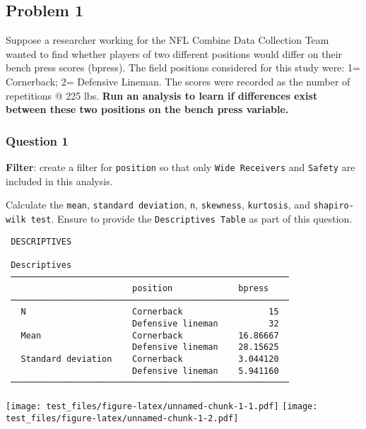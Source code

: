 \documentclass[
]{article}
\begin{document}
\hypertarget{problem-1}{%
\subsection{Problem 1}\label{problem-1}}

Suppose a researcher working for the NFL Combine Data Collection Team
wanted to find whether players of two different positions would differ
on their bench press scores (bpress). The field positions considered for
this study were: 1= Cornerback; 2= Defensive Lineman. The scores were
recorded as the number of repetitions @ 225 lbs. \textbf{Run an analysis
to learn if differences exist between these two positions on the bench
press variable.}

\hypertarget{question-1}{%
\subsubsection{Question 1}\label{question-1}}

\textbf{Filter}: create a filter for \texttt{position} so that only
\texttt{Wide\ Receivers} and \texttt{Safety} are included in this
analysis.

Calculate the \texttt{mean}, \texttt{standard\ deviation}, \texttt{n},
\texttt{skewness}, \texttt{kurtosis}, and \texttt{shapiro-wilk\ test}.
Ensure to provide the \texttt{Descriptives\ Table} as part of this
question.

\begin{verbatim}
 DESCRIPTIVES

 Descriptives                                            
 ─────────────────────────────────────────────────────── 
                         position             bpress     
 ─────────────────────────────────────────────────────── 
   N                     Cornerback                 15   
                         Defensive lineman          32   
   Mean                  Cornerback           16.86667   
                         Defensive lineman    28.15625   
   Standard deviation    Cornerback           3.044120   
                         Defensive lineman    5.941160   
 ─────────────────────────────────────────────────────── 
\end{verbatim}

\texttt{[image: test\_files/figure-latex/unnamed-chunk-1-1.pdf]}
\texttt{[image: test\_files/figure-latex/unnamed-chunk-1-2.pdf]}
\end{document}
